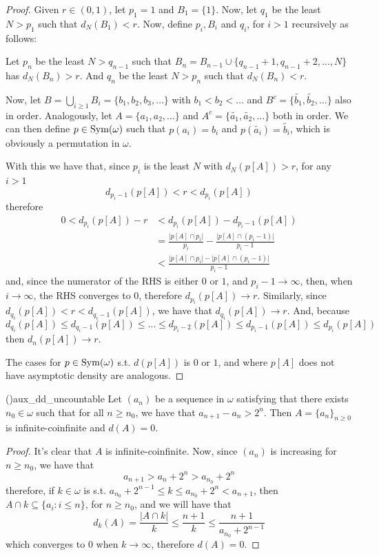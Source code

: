 \begin{proof}
    Given $r\in(0,1)$, let $p_1=1$ and $B_1=\{1\}$. Now, let $q_1$ be the least $N>p_1$ such that $d_N(B_1)<r$. Now, define $p_i,B_i$ and $q_i$, for $i>1$ recursively as follows:

    Let $p_n$ be the least $N>q_{n-1}$ such that $B_n=B_{n-1}\cup\{q_{n-1}+1,q_{n-1}+2,\dots,N\}$ has $d_N(B_n)>r$. And $q_n$ be the least $N>p_n$ such that $d_N(B_n)<r$.

    Now, let $B=\bigcup_{i\geq1}B_i=\{b_1,b_2,b_3,\dots\}$ with $b_1<b_2<\dots$ and $B^c=\{\tilde{b_1},\tilde{b_2},\dots\}$ also in order. Analogously, let $A=\{a_1,a_2,\dots\}$ and $A^c=\{\tilde{a_1},\tilde{a_2},\dots\}$ both in order. We can then define $p\in\mathrm{Sym}(\omega)$ such that $p(a_i)=b_i$ and $p(\tilde{a_i})=\tilde{b_i}$, which is obviously a permutation in $\omega$.

    With this we have that, since $p_i$ is the least $N$ with $d_N(p[A])>r$, for any $i>1$
    $$d_{p_i-1}(p[A])<r<d_{p_i}(p[A])$$
    therefore
    \begin{align*}
        0<d_{p_i}(p[A])-r & < d_{p_i}(p[A])-d_{p_i-1}(p[A])\\
        & = \frac{\lvert p[A]\cap p_i\rvert}{p_i}-\frac{\lvert p[A]\cap (p_i-1)\rvert}{p_i-1}\\
        & < \frac{\lvert p[A]\cap p_i\rvert-\lvert p[A]\cap (p_i-1)\rvert}{p_i-1}
    \end{align*}
    and, since the numerator of the RHS is either $0$ or $1$, and $p_i-1\to\infty$, then, when $i\to\infty$, the RHS converges to $0$, therefore $d_{p_i}(p[A])\to r$. Similarly, since $d_{q_i}(p[A])<r<d_{q_i-1}(p[A])$, we have that $d_{q_i}(p[A])\to r$. And, because
    $$d_{q_i}(p[A])\leq d_{q_i-1}(p[A])\leq \dots\leq d_{p_i-2}(p[A])\leq d_{p_i-1}(p[A])\leq d_{p_i}(p[A])$$
    then $d_n(p[A])\to r$.

    The cases for $p\in\mathrm{Sym}(\omega)$ s.t. $d(p[A])$ is $0$ or $1$, and where $p[A]$ does not have asymptotic density are analogous.
\end{proof}

\begin{lemma}{(\cite{brech})}{aux_dd_uncountable}
    Let $(a_n)$ be a sequence in $\omega$ satisfying that there exists $n_0\in\omega$ such that for all $n\geq n_0$, we have that $a_{n+1}-a_n>2^n$. Then $A=\{a_n\}_{n\geq0}$ is infinite-coinfinite and $d(A)=0$.
\end{lemma}

\begin{proof}
    It's clear that $A$ is infinite-coinfinite. Now, since $(a_n)$ is increasing for $n\geq n_0$, we have that
    $$a_{n+1}>a_n+2^n>a_{n_0}+2^n$$
    therefore, if $k\in\omega$ is s.t. $a_{n_0}+2^{n-1}\leq k\leq a_{n_0}+2^n<a_{n+1}$, then $A\cap k\subseteq\{a_i:i\leq n\}$, for $n\geq n_0$, and we will have that
    $$d_k(A)=\frac{\lvert A\cap k\rvert}{k}\leq\frac{n+1}{k}\leq\frac{n+1}{a_{n_0}+2^{n-1}}$$
    which converges to $0$ when $k\to\infty$, therefore $d(A)=0$.
\end{proof}

